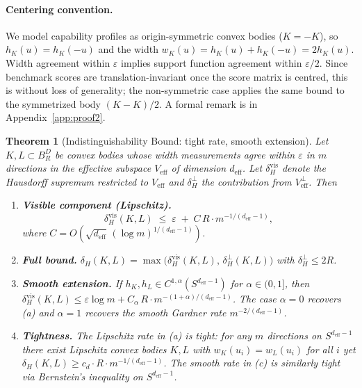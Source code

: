 \documentclass{article}
\newtheorem{theorem}{Theorem}
\begin{document}
\paragraph{Centering convention.}
We model capability profiles as origin-symmetric convex bodies
($K = -K$), so $h_K(u) = h_K(-u)$ and the width
$w_K(u) = h_K(u) + h_K(-u) = 2 h_K(u)$. Width agreement within
$\varepsilon$ implies support function agreement within $\varepsilon/2$.
Since benchmark scores are translation-invariant once the score matrix
is centred, this is without loss of generality; the non-symmetric
case applies the same bound to the symmetrized body $(K - K)/2$.
A formal remark is in Appendix~\ref{app:proof2}.

\begin{theorem}[Indistinguishability Bound: tight rate, smooth extension]
\label{thm:body:indist}
Let $K, L \subset B_R^D$ be convex bodies whose width measurements
agree within $\varepsilon$ in $m$ directions in the effective subspace
$V_{\mathrm{eff}}$ of dimension $d_{\mathrm{eff}}$. Let
$\delta_H^{\mathrm{vis}}$ denote the Hausdorff supremum restricted to
$V_{\mathrm{eff}}$ and $\delta_H^{\perp}$ the contribution from
$V_{\mathrm{eff}}^\perp$. Then
\begin{enumerate}[label=(\alph*), leftmargin=1.5em, itemsep=1pt]
\item \textbf{Visible component (Lipschitz).}
\begin{equation}
\label{eq:thm2vis}
  \delta_H^{\mathrm{vis}}(K, L) \;\le\; \varepsilon
  \;+\; C \, R \cdot m^{-1/(d_{\mathrm{eff}} - 1)},
\end{equation}
where $C = O(\sqrt{d_{\mathrm{eff}}}\,(\log m)^{1/(d_{\mathrm{eff}}-1)})$.
\item \textbf{Full bound.}
$\delta_H(K, L) = \max\!\big(\delta_H^{\mathrm{vis}}(K, L),\,
\delta_H^{\perp}(K, L)\big)$ with $\delta_H^{\perp} \le 2R$.
\item \textbf{Smooth extension.} If $h_K, h_L \in C^{1,\alpha}(S^{d_{\mathrm{eff}}-1})$
for $\alpha \in (0, 1]$, then
$\delta_H^{\mathrm{vis}}(K, L) \le \varepsilon \log m + C_\alpha \, R \cdot
m^{-(1+\alpha)/(d_{\mathrm{eff}}-1)}$. The case $\alpha = 0$ recovers (a)
and $\alpha = 1$ recovers the smooth Gardner rate
$m^{-2/(d_{\mathrm{eff}}-1)}$.
\item \textbf{Tightness.} The Lipschitz rate in (a) is tight: for any
$m$ directions on $S^{d_{\mathrm{eff}}-1}$ there exist Lipschitz
convex bodies $K, L$ with $w_K(u_i) = w_L(u_i)$ for all $i$ yet
$\delta_H(K, L) \ge c_d \cdot R \cdot m^{-1/(d_{\mathrm{eff}}-1)}$.
The smooth rate in (c) is similarly tight via Bernstein's inequality
on $S^{d_{\mathrm{eff}}-1}$.
\end{enumerate}
\end{theorem}
\end{document}
